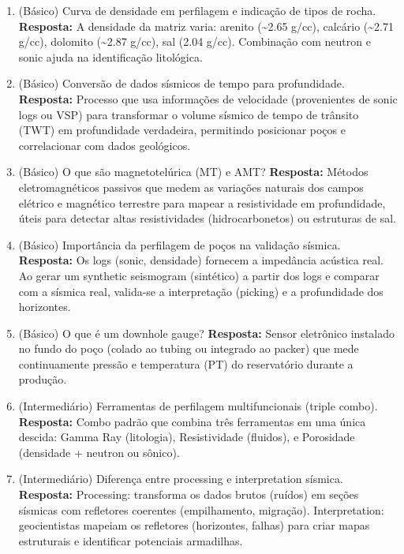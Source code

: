\documentclass[11pt,a4paper]{article}
\begin{document}
\begin{enumerate}
  \item (Básico) Curva de densidade em perfilagem e indicação de tipos de rocha.
  \textbf{Resposta:} A densidade da matriz varia: arenito (\textasciitilde2.65 g/cc), calcário (\textasciitilde2.71 g/cc), dolomito (\textasciitilde2.87 g/cc), sal (2.04 g/cc). Combinação com neutron e sonic ajuda na identificação litológica.

  \item (Básico) Conversão de dados sísmicos de tempo para profundidade.
  \textbf{Resposta:} Processo que usa informações de velocidade (provenientes de sonic logs ou VSP) para transformar o volume sísmico de tempo de trânsito (TWT) em profundidade verdadeira, permitindo posicionar poços e correlacionar com dados geológicos.

  \item (Básico) O que são magnetotelúrica (MT) e AMT?
  \textbf{Resposta:} Métodos eletromagnéticos passivos que medem as variações naturais dos campos elétrico e magnético terrestre para mapear a resistividade em profundidade, úteis para detectar altas resistividades (hidrocarbonetos) ou estruturas de sal.

  \item (Básico) Importância da perfilagem de poços na validação sísmica.
  \textbf{Resposta:} Os logs (sonic, densidade) fornecem a impedância acústica real. Ao gerar um synthetic seismogram (sintético) a partir dos logs e comparar com a sísmica real, valida-se a interpretação (picking) e a profundidade dos horizontes.

  \item (Básico) O que é um downhole gauge?
  \textbf{Resposta:} Sensor eletrônico instalado no fundo do poço (colado ao tubing ou integrado ao packer) que mede continuamente pressão e temperatura (PT) do reservatório durante a produção.

  \item (Intermediário) Ferramentas de perfilagem multifuncionais (triple combo).
  \textbf{Resposta:} Combo padrão que combina três ferramentas em uma única descida: Gamma Ray (litologia), Resistividade (fluidos), e Porosidade (densidade + neutron ou sônico).

  \item (Intermediário) Diferença entre processing e interpretation sísmica.
  \textbf{Resposta:} Processing: transforma os dados brutos (ruídos) em seções sísmicas com refletores coerentes (empilhamento, migração). Interpretation: geocientistas mapeiam os refletores (horizontes, falhas) para criar mapas estruturais e identificar potenciais armadilhas.


\end{enumerate}
\end{document}
